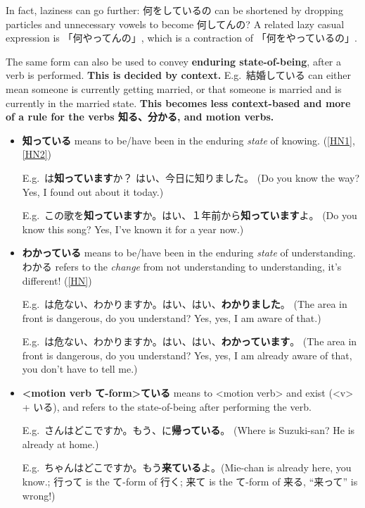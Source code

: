 \documentclass[../nihongo-gakushuu-kyouzai-grammar.tex]{subfiles}
\begin{document}
In fact, laziness can go further: 何をしているの can be shortened by dropping particles and unnecessary vowels to become 何してんの? A related lazy casual expression is 「何やってんの」, which is a contraction of 「何をやっているの」.

The same form can also be used to convey \textbf{enduring state-of-being}, after a verb is performed. \textbf{This is decided by context.} E.g.\ 結婚している can either mean someone is currently getting married, or that someone is married and is currently in the married state. \textbf{This becomes less context-based and more of a rule for the verbs 知る、分かる, and motion verbs.}

\begin{itemize}
    \item \textbf{知っている} means to be/have been in the enduring \emph{state} of knowing.  (\href{https://ja.hinative.com/questions/258648}{[HN1]}, \href{https://ja.hinative.com/questions/10745394}{[HN2]})

    E.g.\ は\textbf{知っています}か？ はい、今日に知りました。 (Do you know the way? Yes, I found out about it today.)

    E.g.\ この歌を\textbf{知っています}か。はい、１年前から\textbf{知っています}よ。 (Do you know this song? Yes, I've known it for a year now.)

    \item \textbf{わかっている} means to be/have been in the enduring \emph{state} of understanding. わかる refers to the \emph{change} from not understanding to understanding, it's different! (\href{https://ja.hinative.com/questions/355185}{[HN]})

    E.g.\ は危ない、わかりますか。はい、はい、\textbf{わかりました}。 (The area in front is dangerous, do you understand? Yes, yes, I am aware of that.)

    E.g.\ は危ない、わかりますか。はい、はい、\textbf{わかっています}。 (The area in front is dangerous, do you understand? Yes, yes, I am already aware of that, you don't have to tell me.)

    \item \textbf{<motion verb て-form>ている} means to <motion verb> and exist (<v> + いる), and refers to the state-of-being after performing the verb.

    E.g.\ さんはどこですか。もう、に\textbf{帰っている}。 (Where is Suzuki-san? He is already at home.)

    E.g.\ ちゃんはどこですか。もう\textbf{来ている}よ。(Mie-chan is already here, you know.; 行って is the て-form of 行く; 来て is the て-form of 来る, ``来って'' is wrong!)
\end{itemize}
\end{document}
